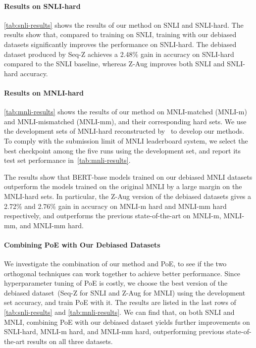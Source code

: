\paragraph{Results on SNLI-hard}
\cref{tab:snli-results} shows the results of our method on SNLI and SNLI-hard. 
The results show that, compared to training on SNLI, training with our debiased datasets significantly improves the performance on SNLI-hard. 
The debiased dataset produced by Seq-Z achieves a 2.48\% gain in accuracy on SNLI-hard compared to the SNLI baseline, 
whereas Z-Aug improves both SNLI and SNLI-hard accuracy.


\paragraph{Results on MNLI-hard}
\cref{tab:mnli-results} shows the results of our method on MNLI-matched (MNLI-m) and MNLI-mismatched (MNLI-mm), and their corresponding hard sets.
We use the development sets of MNLI-hard reconstructed by~\citep{karimi-mahabadi-etal-2020-end} to develop our methods. 
To comply with the submission limit of MNLI leaderboard system,
we select the best checkpoint among the five runs using the development set, and report its test set performance in~\cref{tab:mnli-results}.


The results show that BERT-base models trained on our debiased MNLI datasets outperform the models trained on the original MNLI by a large margin on the MNLI-hard sets.
In particular, the Z-Aug version of the debiased datasets gives a 2.72\% and 2.76\% gain in accuracy on MNLI-m hard and MNLI-mm hard respectively, and outperforms the previous state-of-the-art on MNLI-m, MNLI-mm, and MNLI-mm hard.



\paragraph{Combining PoE with Our Debiased Datasets}

We investigate the combination of our method and PoE, to see if the two orthogonal techniques can work together to achieve better performance.
Since hyperparameter tuning of PoE is costly, we choose the best version of the debiased dataset~(Seq-Z for SNLI and Z-Aug for MNLI) using the development set accuracy, and train PoE with it.
The results are listed in the last rows of \cref{tab:snli-results} and \cref{tab:mnli-results}.
We can find that, on both SNLI and MNLI, combining PoE with our debiased dataset yields further improvements on SNLI-hard, MNLI-m hard, and MNLI-mm hard, outperforming previous state-of-the-art results on all three datasets.




